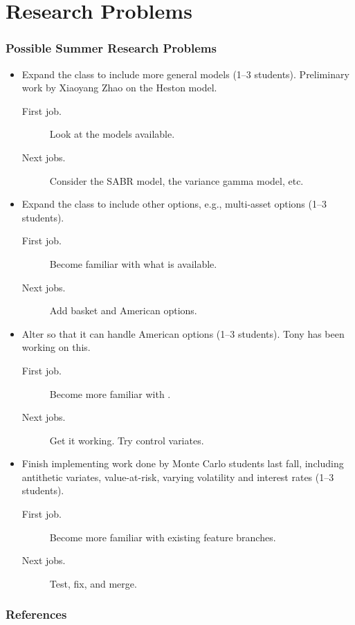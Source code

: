 \documentclass[10pt,compress,xcolor={usenames,dvipsnames}]{beamer} %
\begin{document}
\section{Research Problems}
\begin{frame}[allowframebreaks]
\frametitle{Possible Summer Research Problems}

\begin{itemize}

\item Expand the class  to include more general models (1--3 students).  Preliminary work by Xiaoyang Zhao on the Heston model.
\begin{description}
\item[First job.] Look at the models available.
\item[Next jobs.] Consider the SABR model, the variance gamma model, etc.
\end{description}

\item Expand the class  to include other options, e.g., multi-asset options (1--3 students).  
\begin{description}
\item[First job.] Become familiar with what is available.
\item[Next jobs.] Add basket  and American options.
\end{description}

\item Alter  so that it can handle American options  (1--3 students).  Tony has been working on this.
\begin{description}
	\item[First job.] Become more familiar with .
	\item[Next jobs.] Get it working.  Try control variates.
\end{description}

\item Finish implementing work done by Monte Carlo students last fall, including antithetic variates, value-at-risk, varying volatility and interest rates (1--3 students). 
\begin{description}
	\item[First job.] Become more familiar with existing feature branches.
	\item[Next jobs.] Test, fix, and merge.
\end{description}

\end{itemize}
\end{frame}


\begin{frame}\frametitle{References}

\end{frame}
\end{document}
